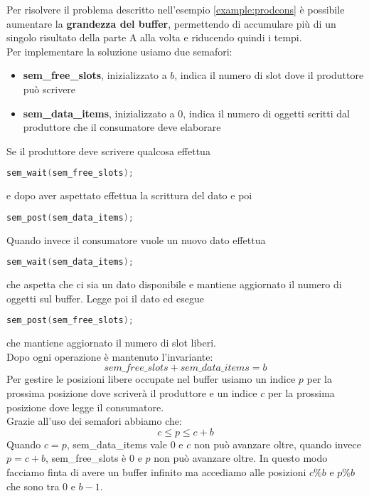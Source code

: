 Per risolvere il problema descritto nell'esempio \ref{example:prodcons} è possibile aumentare la \textbf{grandezza del buffer}, permettendo di accumulare più di un singolo risultato della parte A alla volta e riducendo quindi i tempi.\\
Per implementare la soluzione usiamo due semafori:
\begin{itemize}
	\item \textbf{sem\_free\_slots}, inizializzato a $b$, indica il numero di slot dove il produttore può scrivere
	\item \textbf{sem\_data\_items}, inizializzato a $0$, indica il numero di oggetti scritti dal produttore che il consumatore deve elaborare
\end{itemize}
Se il produttore deve scrivere qualcosa effettua
\begin{lstlisting}[language=C]
	sem_wait(sem_free_slots);
\end{lstlisting}
e dopo aver aspettato effettua la scrittura del dato e poi
\begin{lstlisting}[language=C]
	sem_post(sem_data_items);
\end{lstlisting}
Quando invece il consumatore vuole un nuovo dato effettua
\begin{lstlisting}[language=C]
	sem_wait(sem_data_items);
\end{lstlisting}
che aspetta che ci sia un dato disponibile e mantiene aggiornato il numero di oggetti sul buffer. Legge poi il dato ed esegue
\begin{lstlisting}[language=C]
	sem_post(sem_free_slots);
\end{lstlisting}
che mantiene aggiornato il numero di slot liberi.\\
Dopo ogni operazione è mantenuto l'invariante:
\begin{equation*}
	sem\_free\_slots + sem\_data\_items = b
\end{equation*}
Per gestire le posizioni libere occupate nel buffer usiamo un indice $p$ per la prossima posizione dove scriverà il produttore e un indice $c$ per la prossima posizione dove legge il consumatore.\\
Grazie all'uso dei semafori abbiamo che:
\begin{equation*}
	c \leq p \leq c+b
\end{equation*}
Quando $c=p$, sem\_data\_items vale $0$ e $c$ non può avanzare oltre, quando invece $p=c+b$, sem\_free\_slots è $0$ e $p$ non può avanzare oltre. In questo modo facciamo finta di avere un buffer infinito ma accediamo alle posizioni $c\%b$ e $p\%b$ che sono tra $0$ e $b-1$.
